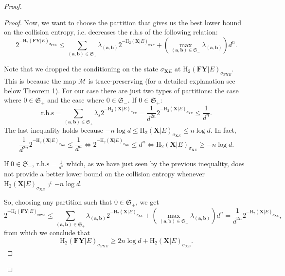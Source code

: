 \begin{proof}
\begin{proof}
Now, we want to choose the partition that gives us the best lower bound on the collision entropy, i.e. decreases the r.h.s of the following relation:
\begin{equation*}
2^{-\text{H}_2(\mathbf{F}\mathbf{Y} | E)_{\sigma_{\mathbf{F}\mathbf{Y} E}}} \leq \sum_{(\bm{a},\bm{b}) \in \mathfrak{S}_+} \lambda_{(\bm{a},\bm{b})} 2^{-\text{H}_2(\mathbf{X}| E)_{\sigma_{\mathbf{X} E}}} + (\max_{(\bm{a},\bm{b}) \in \mathfrak{S}_-} \lambda_{(\bm{a},\bm{b})}) d^n.
\end{equation*}

Note that  we dropped the conditioning on the state $\sigma_{\mathbf{X}E}$ at $\text{H}_2(\mathbf{F}\mathbf{Y} | E)_{\sigma_{\mathbf{F}\mathbf{Y} E}}$. This is because the map $\mathcal{M}$ is trace-preserving (for a detailed explanation see \cite{Dupuis2015} below Theorem 1). For our case there are just two types of partitions: the case where $0 \in \mathfrak{S}_+$ and the case where $0 \in \mathfrak{S}_-$. If $0 \in \mathfrak{S}_+$:
\begin{equation*}
\text{r.h.s} = \sum_{(\bm{a}, \bm{b}) \in \mathfrak{S}_+} \lambda_{s} 2^{-\text{H}_2(\mathbf{X}| E)_{\sigma_{\mathbf{X} E}}} = \frac{1}{d^{2n}} 2^{-\text{H}_2(\mathbf{X}| E)_{\sigma_{\mathbf{X} E}}} \leq \frac{1}{d^n}.
\end{equation*}
The last inequality holds because $-n\log d \leq \text{H}_2(\mathbf{X}| E)_{\sigma_{\mathbf{X} E}} \leq n\log d$. In fact,
\begin{equation*}
 \frac{1}{d^{2n}} 2^{-\text{H}_2(\mathbf{X}| E)_{\sigma_{\mathbf{X} E}}} \leq \frac{1}{d^n}
\iff 2^{-\text{H}_2(\mathbf{X}| E)_{\sigma_{\mathbf{X} E}}} \leq d^n 
\iff \text{H}_2(\mathbf{X}| E)_{\sigma_{\mathbf{X} E}}\geq -n\log d.
\end{equation*}

If $0 \in \mathfrak{S}_-$, $\text{r.h.s} = \frac{1}{d^n}$ which, as we have just seen by the previous inequality, does not provide a better lower bound on the collision entropy whenever $\text{H}_2(\mathbf{X}| E)_{\sigma_{\mathbf{X} E}} \neq -n\log d$.

So, choosing any partition such that $0 \in \mathfrak{S}_+$, we get
\begin{equation*}
2^{-\text{H}_2(\mathbf{F}\mathbf{Y} | E)_{\sigma_{\mathbf{F}\mathbf{Y} E}}} \leq \sum_{(\bm{a}, \bm{b}) \in \mathfrak{S}_+} \lambda_{(\bm{a}, \bm{b})} 2^{-\text{H}_2(\mathbf{X}| E)_{\sigma_{\mathbf{X} E}}} + (\max_{(\bm{a}, \bm{b}) \in \mathfrak{S}_-} \lambda_{(\bm{a}, \bm{b})}) d^n =\frac{1}{d^{2n}} 2^{-\text{H}_2(\mathbf{X} | E)_{\sigma_{\mathbf{X} E}}},
\end{equation*}
from which we conclude that
\begin{equation}
\text{H}_2(\mathbf{F}\mathbf{Y} | E)_{\sigma_{\mathbf{F}\mathbf{Y} E}} \geq 2n\log d + \text{H}_2(\mathbf{X}|E)_{\sigma_{\mathbf{X} E}}.  \label{eqn:firstineq} 
\end{equation}


\end{proof}
\end{proof}
